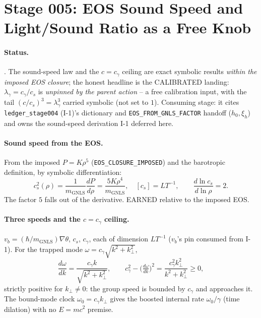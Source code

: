 \section{Stage 005: EOS Sound Speed and Light/Sound Ratio as a Free Knob}

\claimstatus{\StatusReduced}

\paragraph{Status.}
\StatusReduced. The sound-speed law and the \(c=c_\gamma\) ceiling are exact
symbolic results \emph{within the imposed EOS closure}; the honest headline is the
CALIBRATED landing: \(\lambda_\gamma=c_\gamma/c_s\) is \emph{unpinned by the parent
action} -- a free calibration input, with the tail \((c/c_s)^3=\lambda_\gamma^3\)
carried symbolic (not set to \(1\)). Consuming stage: it cites
\texttt{ledger\_stage004} (I-1)'s dictionary and \texttt{EOS\_FROM\_GNLS\_FACTOR}
handoff (\(h_0,\xi_h\)) and owns the sound-speed derivation I-1 deferred here.

\paragraph{Sound speed from the EOS.}
From the imposed \(P=K\rho^5\) (\texttt{EOS\_CLOSURE\_IMPOSED}) and the barotropic
definition, by symbolic differentiation:
\[
  c_s^2(\rho)=\frac{1}{m_{\mathrm{GNLS}}}\frac{dP}{d\rho}
  =\frac{5K\rho^4}{m_{\mathrm{GNLS}}},\quad [c_s]=LT^{-1},\qquad
  \frac{d\ln c_s}{d\ln\rho}=2 .
\]
The factor \(5\) falls out of the derivative. EARNED relative to the imposed EOS.

\paragraph{Three speeds and the \(c=c_\gamma\) ceiling.}
 \(v_b=(\hbar/m_{\mathrm{GNLS}})\nabla\theta\),
\(c_s\), \(c_\gamma\), each of dimension \(LT^{-1}\) (\(v_b\)'s pin consumed from
I-1).  For the trapped mode
\(\omega=c_\gamma\sqrt{k^2+k_\perp^2}\),
\[
  \frac{d\omega}{dk}=\frac{c_\gamma k}{\sqrt{k^2+k_\perp^2}},\qquad
  c_\gamma^2-\Big(\tfrac{d\omega}{dk}\Big)^2=\frac{c_\gamma^2 k_\perp^2}{k^2+k_\perp^2}\ge 0,
\]
strictly positive for \(k_\perp\neq0\): the group speed is bounded by \(c_\gamma\)
and approaches it. The bound-mode clock \(\omega_0=c_\gamma k_\perp\) gives the
boosted internal rate \(\omega_0/\gamma\) (time dilation) with no \(E=mc^2\)
premise.

